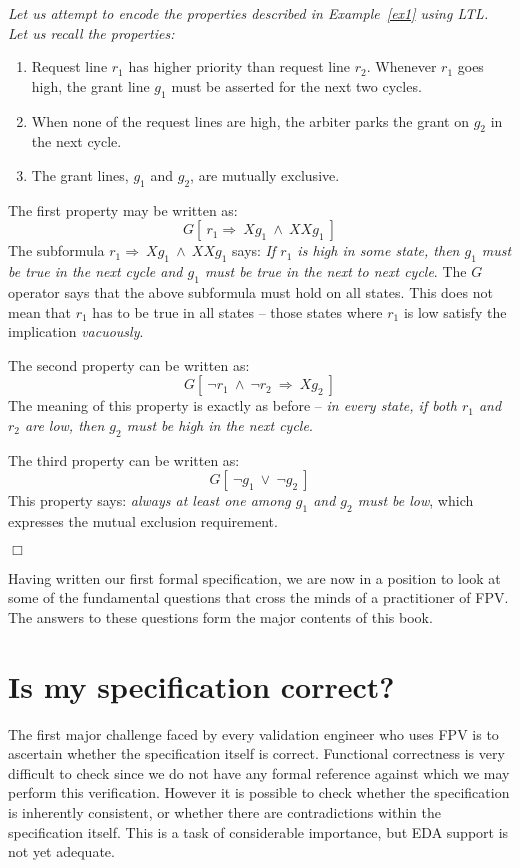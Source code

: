 \begin{example} \label{ex2}
{\em 
Let us attempt to encode the properties described in Example~\ref{ex1} using
LTL. Let us recall the properties:
\begin{enumerate}

\item Request line $r_1$ has higher priority than request line $r_2$. Whenever
        $r_1$ goes high, the grant line $g_1$ must be asserted for the
        next two cycles.

\item When none of the request lines are high, the arbiter parks the grant
        on $g_2$ in the next cycle.

\item The grant lines, $g_1$ and $g_2$, are mutually exclusive.

\end{enumerate}
The first property may be written as:
\[ G[\ r_1 \Rightarrow\  Xg_1\ \land\  XXg_1\ ] \]
The subformula $r_1 \Rightarrow\  Xg_1\ \land\  XXg_1$ says: {\em If $r_1$
is high in some state, then $g_1$ must be true in the next cycle and $g_1$
must be true in the next to next cycle}. The $G$ operator says that the
above subformula must hold on all states. This does not mean that $r_1$
has to be true in all states -- those states where $r_1$ is low satisfy the
implication {\em vacuously}.

The second property can be written as:
\[ G[\ \neg r_1\ \land\ \neg r_2\ \Rightarrow\  Xg_2\ ] \]
The meaning of this property is exactly as before -- {\em in every state,
if both $r_1$ and $r_2$ are low, then $g_2$ must be high in the next cycle}.

The third property can be written as:
\[ G[\ \neg g_1\ \lor\ \neg g_2\ ] \]
This property says: {\em always at least one among $g_1$ and $g_2$ must be
low}, which expresses the mutual exclusion requirement.
} $\Box$
\end{example}

Having written our first formal specification, we are now in a position to
look at some of the fundamental questions that cross the minds of a 
practitioner of FPV. The answers to these questions form the major contents
of this book.

\section{Is my specification correct?}
The first major challenge faced by every validation engineer who uses FPV is
to ascertain whether the specification itself is correct. Functional
correctness is very difficult to check since we do not have any formal
reference against which we may perform this verification. However it is
possible to check whether the specification is inherently consistent, or
whether there are contradictions within the specification itself. This is
a task of considerable importance, but EDA support is not yet adequate. 

